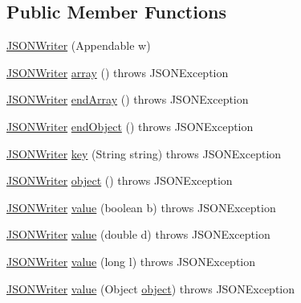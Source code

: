 \subsection*{Public Member Functions}
\begin{DoxyCompactItemize}
\item 
\hyperlink{classorg_1_1json_1_1JSONWriter_af3f8cff9ff3b3d06235c8058f9aa3d19}{J\-S\-O\-N\-Writer} (Appendable w)
\item 
\hyperlink{classorg_1_1json_1_1JSONWriter}{J\-S\-O\-N\-Writer} \hyperlink{classorg_1_1json_1_1JSONWriter_aed48f7396fd364c0bc4f08b51f31afc4}{array} ()  throws J\-S\-O\-N\-Exception 
\item 
\hyperlink{classorg_1_1json_1_1JSONWriter}{J\-S\-O\-N\-Writer} \hyperlink{classorg_1_1json_1_1JSONWriter_a9d310d7ccc581cc070771126ee063ffe}{end\-Array} ()  throws J\-S\-O\-N\-Exception 
\item 
\hyperlink{classorg_1_1json_1_1JSONWriter}{J\-S\-O\-N\-Writer} \hyperlink{classorg_1_1json_1_1JSONWriter_a25cc931ef86998c61f08b1d5eff22146}{end\-Object} ()  throws J\-S\-O\-N\-Exception 
\item 
\hyperlink{classorg_1_1json_1_1JSONWriter}{J\-S\-O\-N\-Writer} \hyperlink{classorg_1_1json_1_1JSONWriter_ab03474f521f6fc4d8cb15d2c129fb435}{key} (String string)  throws J\-S\-O\-N\-Exception 
\item 
\hyperlink{classorg_1_1json_1_1JSONWriter}{J\-S\-O\-N\-Writer} \hyperlink{classorg_1_1json_1_1JSONWriter_a50ed212b9c8c9f6a57c3ddfc6bf3126a}{object} ()  throws J\-S\-O\-N\-Exception 
\item 
\hyperlink{classorg_1_1json_1_1JSONWriter}{J\-S\-O\-N\-Writer} \hyperlink{classorg_1_1json_1_1JSONWriter_a29441174afee5fde940c973d20e056a9}{value} (boolean b)  throws J\-S\-O\-N\-Exception 
\item 
\hyperlink{classorg_1_1json_1_1JSONWriter}{J\-S\-O\-N\-Writer} \hyperlink{classorg_1_1json_1_1JSONWriter_a0d9da178cbec36fc9b6e89e1d840c882}{value} (double d)  throws J\-S\-O\-N\-Exception 
\item 
\hyperlink{classorg_1_1json_1_1JSONWriter}{J\-S\-O\-N\-Writer} \hyperlink{classorg_1_1json_1_1JSONWriter_a5f8bdc612c2629b41420ef8e0ea94a40}{value} (long l)  throws J\-S\-O\-N\-Exception 
\item 
\hyperlink{classorg_1_1json_1_1JSONWriter}{J\-S\-O\-N\-Writer} \hyperlink{classorg_1_1json_1_1JSONWriter_aeab2dfdffed2e034f8598be9c89d4be1}{value} (Object \hyperlink{classorg_1_1json_1_1JSONWriter_a50ed212b9c8c9f6a57c3ddfc6bf3126a}{object})  throws J\-S\-O\-N\-Exception 
\end{DoxyCompactItemize}
